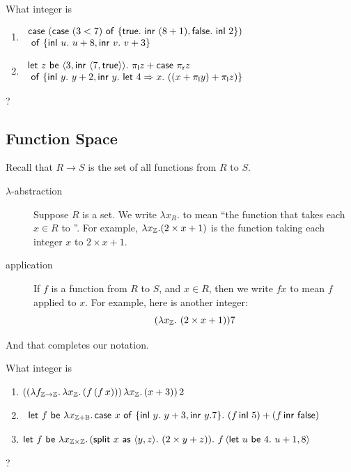 \documentclass[runningheads,12pt]{llncs}
\newcommand{\itletmac}[2]{\mathsf{let}\ {#2}\ \mathsf{be}\ {#1}.\ }
\newcommand{\itsplit}{\mathsf{split}\ }
\newcommand{\itspof}{\ \mathsf{as}\ }
\newcommand{\projl}{\pi_{\mathsf{l}}}
\newcommand{\projr}{\pi_{\mathsf{r}}}
\newcommand{\itlbe}{\Rightarrow}
\begin{document}
\begin{exercise}
What integer is
  \begin{enumerate}
  \item $
    \begin{array}{l}
\itcase (\itcase (3<7) \itof \{\ittrue.\ \ittagr{(8+1)}, \itfalse.\ \ittagl{2} \})  \\
\itof \{ \ittagl{u}.\ u+8, \ittagr{v}.\ v+3 \} \\
\end{array}
$
  \item $
    \begin{array}{l}
\itletmac{ \pair{3}{\ittagr{\pair{7}{\ittrue}}} }{ z }  \projl z + \itcase \projr z \\
\itof \{
\ittagl{y}.\ y+2,
\ittagr{y}.\ \itlet{4} \itlbe x \itin ((x + \projl y) + \projl z)
\}
\end{array}
$
  \end{enumerate}
?
\end{exercise}

\subsection{Function Space}

Recall that $R \rightarrow S$ is the set of all functions from $R$ to $S$.
\begin{description}
\item[$\lambda$-abstraction] Suppose $R$ is a set.  We write $\lambda x_{R}.$ to mean ``the function that takes each $x \in R$ to ''.  For example, $\lambda x_{\mathbb{Z}}. (2 \times x + 1)$ is the function taking each integer $x$ to $2 \times x  + 1$.    
\item[application] If $f$ is a function from $R$ to $S$, and $x \in R$, then we write $fx$ to mean $f$ applied to $x$.  For example, here is another integer:
  \begin{displaymath}
    (\lambda x_{\mathbb{Z}}.\ (2 \times x + 1)) 7
  \end{displaymath}
\end{description}
And that completes our notation.  

\begin{exercise}
What integer is
  \begin{enumerate}
  \item $((\lambda f_{\mathbb{Z} \rightarrow \mathbb{Z}}.\, \lambda x_{\mathbb{Z}}.\, (f\,(f\,x)))\,\lambda x_{\mathbb{Z}}.\, (x+3))\,2$
  \item $
    \begin{array}{l}
\itletmac{ \lambda x_{\integ + \bool}.\, \itcase x \itof \{ \ittagl{y}.\ y+3, \ittagr{y}. 7 \} }{f}   (f \,\ittagl{5})+(f \,\ittagr{\itfalse}) 
\end{array}
$
  \item $\itletmac{ \lambda x_{\integ \times \integ}.\, (\itsplit x \itspof \pair{y}{z}.\ (2 \times y + z)) }{  f } f\,\pair{\itletmac{ 4 }{ u } u+1}{8}$
  \end{enumerate}
?
\end{exercise}
\end{document}
